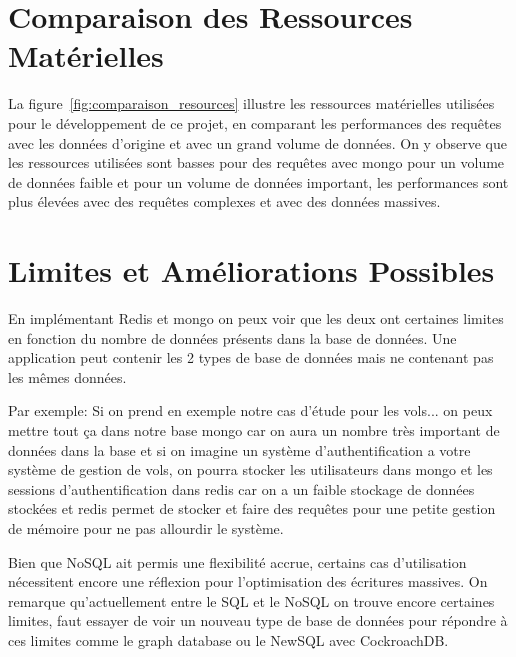 \section{Comparaison des Ressources Matérielles}

La figure~\ref{fig:comparaison_resources} illustre les ressources matérielles utilisées pour le développement de ce projet, en comparant les performances des requêtes avec les données d'origine et avec un grand volume de données. On y observe que les ressources utilisées sont basses pour des requêtes avec mongo pour un volume de données faible et pour un volume de données important, les performances sont plus élevées avec des requêtes complexes et avec des données massives.

\section{Limites et Améliorations Possibles}
En implémentant Redis et mongo on peux voir que les deux ont certaines limites en fonction du nombre de données présents dans la base de données.
Une application peut contenir les 2 types de base de données mais ne contenant pas les mêmes données.

Par exemple:
Si on prend en exemple notre cas d'étude pour les vols... on peux mettre tout ça dans notre base mongo car on aura un nombre très important de données dans la base et si on imagine un système d'authentification a votre système de gestion de vols, on pourra stocker les utilisateurs dans mongo et les sessions d'authentification dans redis car on a un faible stockage de données stockées et redis permet de stocker et faire des requêtes pour une petite gestion de mémoire pour ne pas allourdir le système.

Bien que NoSQL ait permis une flexibilité accrue, certains cas d'utilisation nécessitent encore une réflexion pour l'optimisation des écritures massives. On remarque qu'actuellement entre le SQL et le NoSQL on trouve encore certaines limites, faut essayer de voir un nouveau type de base de données pour répondre à ces limites comme le graph database ou le NewSQL avec CockroachDB.
